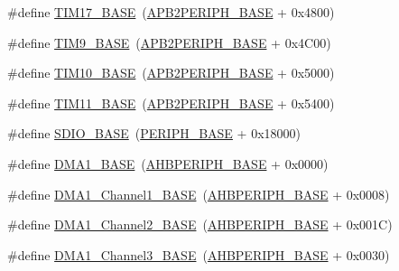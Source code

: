 \begin{DoxyCompactItemize}
\item 
\#define \hyperlink{group___peripheral__memory__map_gaffbedbe30e8c4cffdea326d6c1800574}{T\+I\+M17\+\_\+\+B\+A\+SE}~(\hyperlink{openmotestm_2library_2inc_2stm32f10x__map_8h_a25b99d6065f1c8f751e78f43ade652cb}{A\+P\+B2\+P\+E\+R\+I\+P\+H\+\_\+\+B\+A\+SE} + 0x4800)
\item 
\#define \hyperlink{group___peripheral__memory__map_ga92ae902be7902560939223dd765ece08}{T\+I\+M9\+\_\+\+B\+A\+SE}~(\hyperlink{openmotestm_2library_2inc_2stm32f10x__map_8h_a25b99d6065f1c8f751e78f43ade652cb}{A\+P\+B2\+P\+E\+R\+I\+P\+H\+\_\+\+B\+A\+SE} + 0x4\+C00)
\item 
\#define \hyperlink{group___peripheral__memory__map_ga3eff32f3801db31fb4b61d5618cad54a}{T\+I\+M10\+\_\+\+B\+A\+SE}~(\hyperlink{openmotestm_2library_2inc_2stm32f10x__map_8h_a25b99d6065f1c8f751e78f43ade652cb}{A\+P\+B2\+P\+E\+R\+I\+P\+H\+\_\+\+B\+A\+SE} + 0x5000)
\item 
\#define \hyperlink{group___peripheral__memory__map_ga3a4a06bb84c703084f0509e105ffaf1d}{T\+I\+M11\+\_\+\+B\+A\+SE}~(\hyperlink{openmotestm_2library_2inc_2stm32f10x__map_8h_a25b99d6065f1c8f751e78f43ade652cb}{A\+P\+B2\+P\+E\+R\+I\+P\+H\+\_\+\+B\+A\+SE} + 0x5400)
\item 
\#define \hyperlink{group___peripheral__memory__map_ga95dd0abbc6767893b4b02935fa846f52}{S\+D\+I\+O\+\_\+\+B\+A\+SE}~(\hyperlink{openmotestm_2library_2inc_2stm32f10x__map_8h_a9171f49478fa86d932f89e78e73b88b0}{P\+E\+R\+I\+P\+H\+\_\+\+B\+A\+SE} + 0x18000)
\item 
\#define \hyperlink{group___peripheral__memory__map_gab2d8a917a0e4ea99a22ac6ebf279bc72}{D\+M\+A1\+\_\+\+B\+A\+SE}~(\hyperlink{openmotestm_2library_2inc_2stm32f10x__map_8h_a92eb5d49730765d2abd0f5b09548f9f5}{A\+H\+B\+P\+E\+R\+I\+P\+H\+\_\+\+B\+A\+SE} + 0x0000)
\item 
\#define \hyperlink{group___peripheral__memory__map_ga888dbc1608243badeb3554ffedc7364c}{D\+M\+A1\+\_\+\+Channel1\+\_\+\+B\+A\+SE}~(\hyperlink{openmotestm_2library_2inc_2stm32f10x__map_8h_a92eb5d49730765d2abd0f5b09548f9f5}{A\+H\+B\+P\+E\+R\+I\+P\+H\+\_\+\+B\+A\+SE} + 0x0008)
\item 
\#define \hyperlink{group___peripheral__memory__map_ga38a70090eef3687e83fa6ac0c6d22267}{D\+M\+A1\+\_\+\+Channel2\+\_\+\+B\+A\+SE}~(\hyperlink{openmotestm_2library_2inc_2stm32f10x__map_8h_a92eb5d49730765d2abd0f5b09548f9f5}{A\+H\+B\+P\+E\+R\+I\+P\+H\+\_\+\+B\+A\+SE} + 0x001\+C)
\item 
\#define \hyperlink{group___peripheral__memory__map_ga70b3d9f36ca9ce95b4e421c11154fe5d}{D\+M\+A1\+\_\+\+Channel3\+\_\+\+B\+A\+SE}~(\hyperlink{openmotestm_2library_2inc_2stm32f10x__map_8h_a92eb5d49730765d2abd0f5b09548f9f5}{A\+H\+B\+P\+E\+R\+I\+P\+H\+\_\+\+B\+A\+SE} + 0x0030)

\end{DoxyCompactItemize}
